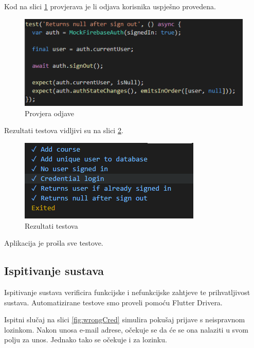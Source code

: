 			\eject
			
			
			Kod na slici \ref{fig:signOut} provjerava je li odjava korisnika uspješno provedena.
			
			\begin{figure}[h]
				\includegraphics[scale=0.75]{slike/signOut.PNG}
				\centering
				\caption{Provjera odjave}
				\label{fig:signOut}
			\end{figure}
			
			Rezultati testova vidljivi su na slici \ref{fig:unitTests}.
			
			\begin{figure}[h]
				\includegraphics[scale=0.75]{slike/unitTests.PNG}
				\centering
				\caption{Rezultati testova}
				\label{fig:unitTests}
			\end{figure}
			
			Aplikacija je prošla sve testove.
			
			
			\eject
			
			\subsection{Ispitivanje sustava}
			
			Ispitivanje sustava verificira funkcijske i nefunkcijske zahtjeve te prihvatljivost sustava. Automatizirane testove smo proveli pomoću Flutter Drivera.
			
			Ispitni slučaj na slici \ref{fig:wrongCred} simulira pokušaj prijave s neispravnom lozinkom. Nakon unosa e-mail adrese, očekuje se da će se ona nalaziti u svom polju za unos. Jednako tako se očekuje i za lozinku.
			
